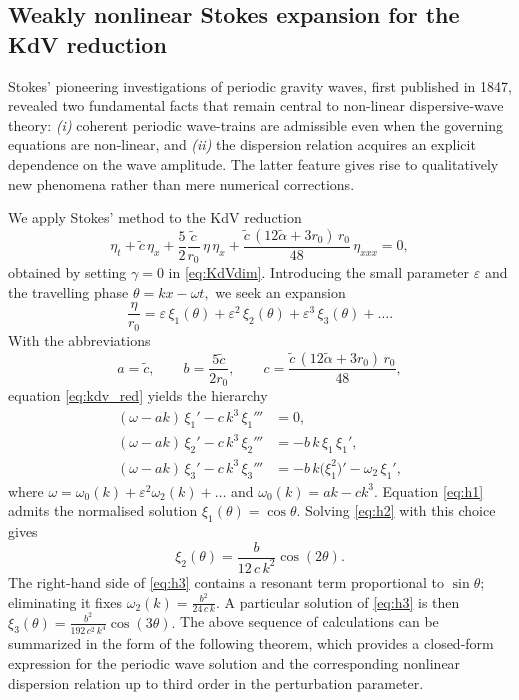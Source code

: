 \documentclass[alpha-refs, 12pt]{wiley-article}
\newcommand{\eps}{\varepsilon}
\begin{document}
\subsection{Weakly nonlinear Stokes expansion for the KdV reduction}

Stokes' pioneering investigations of periodic gravity waves, first published in 1847, revealed two fundamental facts that remain central to non-linear dispersive‐wave theory: \textit{(i)} coherent periodic wave-trains are admissible even when the governing equations are non-linear, and \textit{(ii)} the dispersion relation acquires an explicit dependence on the wave amplitude. The latter feature gives rise to qualitatively new phenomena rather than mere numerical corrections.

We apply Stokes' method to the KdV reduction
\begin{equation}\label{eq:kdv_red}
  \eta_{t}
  +\tilde{c}\,\eta_{x}
  +\frac{5}{2}\frac{\tilde{c}}{r_{0}}\,
   \eta\,\eta_{x}
  +\frac{\tilde{c}\,(12\tilde{\alpha}+3r_{0})\,r_{0}}{48}\,
   \eta_{xxx}
  =0,
\end{equation}
obtained by setting $\gamma=0$ in \eqref{eq:KdVdim}. Introducing the small parameter $\eps$ and the travelling phase
\(
  \theta=kx-\omega t,
\)
we seek an expansion
\begin{equation}\label{eq:stokes_ansatz}
  \frac{\eta}{r_{0}}
  =\eps\,\xi_{1}(\theta)
   +\eps^{2}\,\xi_{2}(\theta)
   +\eps^{3}\,\xi_{3}(\theta)
   +\dots.
\end{equation}
With the abbreviations
\[
  a=\tilde{c},\qquad
  b=\frac{5\tilde{c}}{2r_{0}},\qquad
  c=\frac{\tilde{c}\,(12\tilde{\alpha}+3r_{0})\,r_{0}}{48},
\]
equation \eqref{eq:kdv_red} yields the hierarchy
\begin{align}
  (\omega-ak)\,\xi_{1}'-c\,k^{3}\,\xi_{1}''' &=0, \label{eq:h1}\\
  (\omega-ak)\,\xi_{2}'-c\,k^{3}\,\xi_{2}''' &=-b\,k\,\xi_{1}\,\xi_{1}',
             \label{eq:h2}\\
  (\omega-ak)\,\xi_{3}'-c\,k^{3}\,\xi_{3}'''
     &=-b\,k\bigl(\xi_{1}^{2}\bigr)'
       -\omega_{2}\,\xi_{1}', \label{eq:h3}
\end{align}
where
\(
  \omega=\omega_{0}(k)+\eps^{2}\omega_{2}(k)+\dots
\)
and
\(
  \omega_{0}(k)=ak-ck^{3}.
\)
Equation \eqref{eq:h1} admits the normalised solution
\(
  \xi_{1}(\theta)=\cos\theta.
\)
Solving \eqref{eq:h2} with this choice gives
\[
  \xi_{2}(\theta)=\frac{b}{12\,c\,k^{2}}\cos(2\theta).
\]
The right-hand side of \eqref{eq:h3} contains a resonant term
proportional to $\sin\theta$; eliminating it fixes
\(
  \displaystyle
  \omega_{2}(k)=\frac{b^{2}}{24\,c\,k}.
\)
A particular solution of \eqref{eq:h3} is then
\(
  \displaystyle
  \xi_{3}(\theta)=\frac{b^{2}}{192\,c^{2}\,k^{4}}\cos(3\theta).
\)
The above sequence of calculations can be summarized in the form of the following theorem, which provides a closed-form expression for the periodic wave solution and the corresponding nonlinear dispersion relation up to third order in the perturbation parameter.
\end{document}

